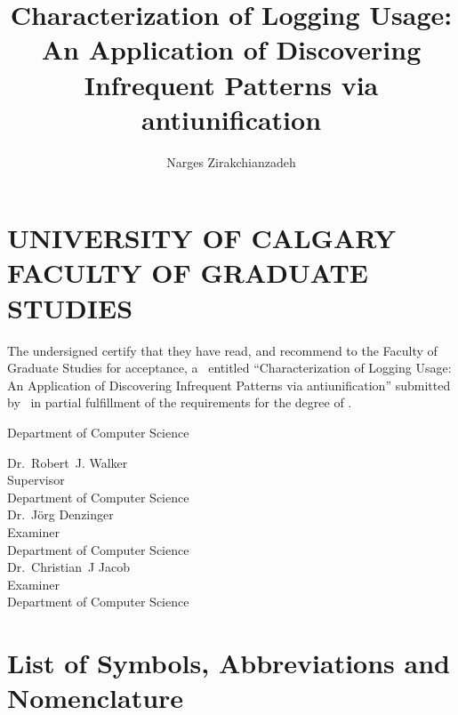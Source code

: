 \documentclass{ucalgthes1}
\title{Characterization of Logging Usage:\\An Application of Discovering Infrequent Patterns via antiunification}
\author{Narges Zirakchianzadeh}
\theoremstyle{plain}
\theoremstyle{definition}
\newcommand{\thestitle}{Characterization of Logging Usage: An Application of Discovering Infrequent Patterns via antiunification}
\begin{document}
\makethesistitle
{}     %
\setcounter{page}{1}


\chapter*{UNIVERSITY OF CALGARY \\ FACULTY OF GRADUATE STUDIES}
\thispagestyle{empty}
The undersigned certify that they have read, and recommend
to the Faculty of Graduate Studies for acceptance, a \Thesis\ entitled
``\thestitle'' submitted by \Author\
in partial fulfillment of the requirements for the degree of
\Degree.\\

%
%

\begin{signing}{Department of Computer Science}

\newsigncolumn

\signline
Dr.~Robert~J. Walker \\
Supervisor \\
Department of Computer Science  \\


\signline
Dr.~J{\"o}rg Denzinger \\
Examiner \\
Department of  Computer Science \\

\signline
Dr.~Christian~J Jacob \\
Examiner \\
Department of  Computer Science \\
\end{signing}

\newpage
{}
{}


\newpage
{}
{}


\begin{singlespace}
\newpage
{}
\tableofcontents
\pagestyle{plain}
\newpage
{}
\listoftables
\pagestyle{plain}
\newpage
{}
\listoffigures
\pagestyle{plain}
\clearpage
\clearpage          %
\end{singlespace}
\newpage
{}
\chapter*{\bf{List of Symbols, Abbreviations and Nomenclature}\hfill} 
\listofsymbols
\pagestyle{plain}
\clearpage
\end{document}
